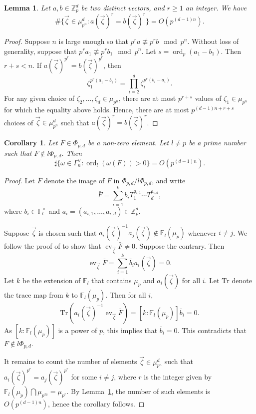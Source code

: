 \documentclass[11pt]{amsart}
\DeclareMathOperator{\ord}{ord}
\DeclareMathOperator{\ev}{ev}
\newtheorem{lemma}[theorem]{Lemma}
\newtheorem{corollary}[theorem]{Corollary}
\numberwithin{equation}{section}
\theoremstyle{remark}
\newcommand{\?}{\stackrel{?}{=}}
\newcommand{\FF}{\mathbb{F}}
\newcommand{\Zp}{\mathbb{Z}_p}
\newcommand{\Tr}{\mathrm{Tr}}
\begin{document}
\begin{lemma}\label{lem:eq-vects}
    Let $a,b\in\Zp^d$ be two distinct vectors, and $r\ge1$ an  integer. We have
    \[
    \#\{\vec\zeta\in\mu_{p^n}^d:a(\vec\zeta)^r=b(\vec\zeta)^r\}=O(p^{(d-1)n}).
    \]
\end{lemma}
\begin{proof}
Suppose $n$ is large enough so that $p^ra\not\equiv p^rb\mod p^n$.
    Without loss of generality, suppose that $p^ra_1\not\equiv p^rb_1\mod p^n$. Let $s=\ord_p(a_1-b_1)$. Then $r+s<n$. If $a(\vec\zeta)^{p^r}=b(\vec\zeta)^{p^r}$, then
    \[
    \zeta_1^{p^r(a_1-b_1)}=\prod_{i=2}^d\zeta_i^{p^r(b_i-a_i)}.
    \]
    For any given choice of $\zeta_2,\dots,\zeta_d\in\mu_{p^n}$, there are at most $p^{r+s}$ values of $\zeta_1\in\mu_{p^n}$ for which the equality above holds. Hence, there are at most $p^{(d-1)n+r+s}$ choices of $\vec\zeta\in\mu_{p^n}^d$ such that $a(\vec\zeta)^r=b(\vec\zeta)^r$.
\end{proof}

\begin{corollary}\label{cor:non-vanish}
    Let $F\in\Phi_{p,d}$ be a non-zero element. Let $l\ne p$ be a prime number such that $F\notin l\Phi_{p,d}$. Then
    \[
    \sharp \{\omega\in\Gamma_n^\vee:\ord_l(\omega(F))>0\}=O(p^{(d-1)n}).
    \]
\end{corollary}
\begin{proof}
Let $\bar F$ denote the image of $F$ in $\Phi_{p,d}/l\Phi_{p,d}$, and write 
\[
\bar F=\sum_{i=1}^kb_iT_1^{a_{i,1}}\cdots T_d^{a_{i,d}},
\]
where $b_i\in \FF_l^\times$ and $a_i=(a_{i,1},\dots,a_{i,d})\in\Zp^d$. 

 Suppose $\vec\zeta$ is chosen such that $a_i(\vec\zeta)^{-1}a_j(\vec\zeta)\notin\FF_l(\mu_p)$ whenever $i\ne j$. We follow the proof of \cite[Theorem~2.2]{sinnott} to show that $\ev_{\vec\zeta}\bar F\ne0$. Suppose the contrary. Then
 \[
 \ev_{\vec\zeta}\bar F=\sum_{i=1}^k\bar b_ia_i(\vec\zeta)=0.
 \]
 Let $k$ be the extension of $\FF_l$ that contains $\mu_p$ and $a_i(\vec\zeta)$ for all $i$. Let $\Tr$ denote the trace map from $k$ to $\FF_l(\mu_p)$. 
Then for all $i$,
\[
\Tr \left(a_i(\vec\zeta)^{-1}\ev_{\vec\zeta}\bar F\right)=[k:\FF_l(\mu_p)]\bar b_i=0.
\]
As $[k:\FF_l(\mu_p)]$ is a power of $p$, this implies that $\bar b_i=0$. This contradicts that $F\notin l\Phi_{p,d}$.
 
 
It remains to count the number of elements $\vec\zeta\in\mu_{p^n}^d$ such that $a_i(\vec\zeta)^{p^r}=a_j(\vec\zeta)^{p^r}$ for some $i\ne j$, where $r$ is the integer given by $\FF_l(\mu_p)\bigcap\mu_{p^\infty}=\mu_{p^r}$. By Lemma~\ref{lem:eq-vects}, the number of such elements is $O(p^{(d-1)n})$, hence the corollary follows.
\end{proof}
\end{document}
